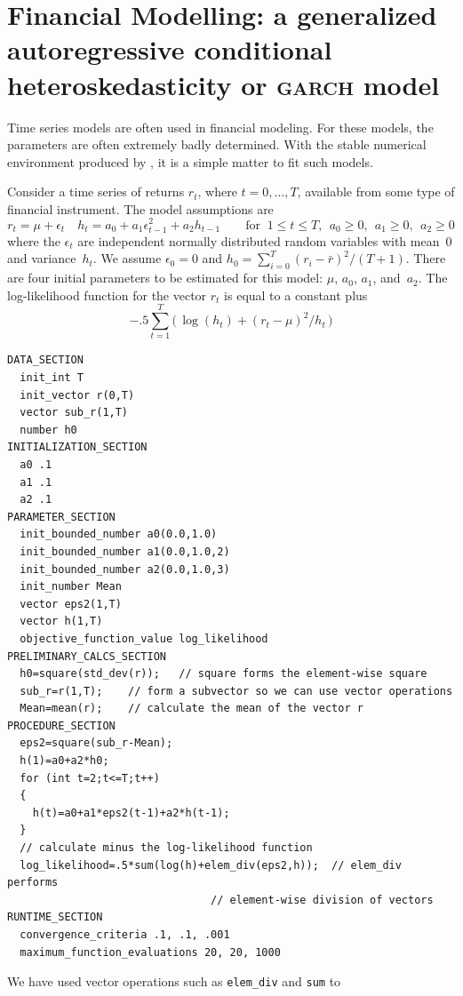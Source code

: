\documentclass{admbmanual}
\begin{document}
\section{Financial Modelling: a generalized autoregressive\br
  conditional \hbox{heteroskedasticity} or \textsc{garch} model}

Time series models are often used in financial modeling. For these models, the
parameters are often extremely badly determined. With the stable numerical
environment produced by \ADM, it is a simple matter to fit such models.

Consider a time series of returns $r_t$, where $t=0,\ldots,T$, available from
some type of financial instrument. The model assumptions are
    $$ r_t = \mu + \epsilon_t\quad
        h_t = a_0 + a_1\epsilon_{t-1}^2 + a_2h_{t-1}\qquad
\textrm{for }\ 1\le t\le T,\ \ a_0\ge 0,\ \ a_1\ge 0,\ \ a_2\ge 0$$
where the $\epsilon_t$ are independent normally distributed random variables
with mean~0 and variance~$h_t$. We assume $\epsilon_0=0$ and $h_0 =
\sum_{i=0}^T(r_i-\bar r)^2/(T+1)$. There are four initial parameters to be
estimated for this model: $\mu$, $a_0$, $a_1$, and~$a_2$. The log-likelihood
function for the vector $r_t$ is equal to a constant plus
$$-.5\sum_{t=1}^T\big(\,\log(h_t)+(r_t-\mu)^2/h_t\,\big)$$
\begin{lstlisting}
DATA_SECTION
  init_int T
  init_vector r(0,T)
  vector sub_r(1,T)
  number h0
INITIALIZATION_SECTION
  a0 .1
  a1 .1
  a2 .1
PARAMETER_SECTION
  init_bounded_number a0(0.0,1.0)
  init_bounded_number a1(0.0,1.0,2)
  init_bounded_number a2(0.0,1.0,3)
  init_number Mean
  vector eps2(1,T)
  vector h(1,T)
  objective_function_value log_likelihood
PRELIMINARY_CALCS_SECTION
  h0=square(std_dev(r));   // square forms the element-wise square
  sub_r=r(1,T);    // form a subvector so we can use vector operations
  Mean=mean(r);    // calculate the mean of the vector r
PROCEDURE_SECTION
  eps2=square(sub_r-Mean);
  h(1)=a0+a2*h0;
  for (int t=2;t<=T;t++)
  {
    h(t)=a0+a1*eps2(t-1)+a2*h(t-1);
  }
  // calculate minus the log-likelihood function
  log_likelihood=.5*sum(log(h)+elem_div(eps2,h));  // elem_div performs
                                // element-wise division of vectors
RUNTIME_SECTION
  convergence_criteria .1, .1, .001
  maximum_function_evaluations 20, 20, 1000
\end{lstlisting}
We have used vector operations such as \texttt{elem\_div} and \texttt{sum} to
\end{document}

